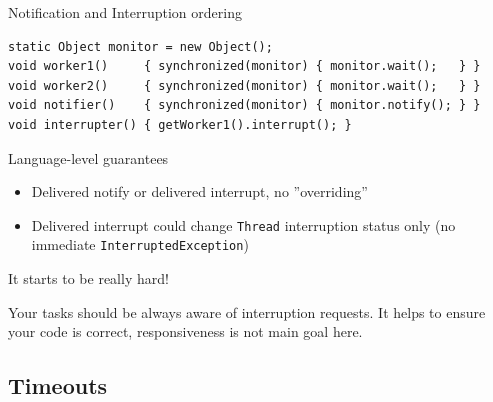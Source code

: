 \begin{frame}[fragile]{Notification and Interruption ordering}

\begin{verbatim}
static Object monitor = new Object();
void worker1()     { synchronized(monitor) { monitor.wait();   } }
void worker2()     { synchronized(monitor) { monitor.wait();   } }
void notifier()    { synchronized(monitor) { monitor.notify(); } }
void interrupter() { getWorker1().interrupt(); }
\end{verbatim}

\pause

Language-level guarantees
\begin{itemize}
    \item Delivered notify or delivered interrupt, no ''overriding''
    \item Delivered interrupt could change \texttt{Thread} interruption status only (no immediate \texttt{InterruptedException})
\end{itemize}

\pause
It starts to be really hard!

\pasue
Your tasks should be always aware of interruption requests. It helps to ensure your code is correct, responsiveness is not main goal here.
\end{frame}

\subsection{Timeouts}
\showTOCSub

